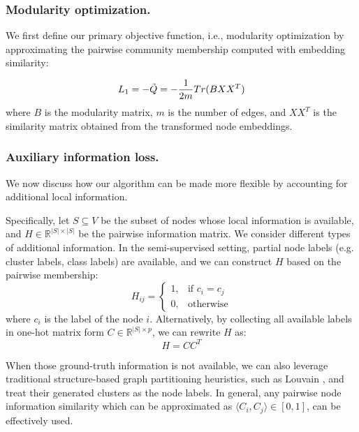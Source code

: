 \subsubsection{Modularity optimization.}
We first define our primary objective function, i.e., modularity optimization by approximating the pairwise community membership computed with embedding similarity:%

\begin{equation}
    L_1=-\Tilde{Q} = -\frac{1}{2m}Tr(BXX^T) 
\end{equation}
where $B$ is the modularity matrix, $m$ is the number of edges, and $XX^T$ is the similarity matrix obtained from the transformed node embeddings.







\subsubsection{Auxiliary information loss.}
We now discuss how our algorithm can be made more flexible by accounting for additional local information. %






Specifically, let $S \subseteq V$ be the subset of nodes whose local information is available, and $H \in \mathbb{R}^{|S| \times |S|}$ be the pairwise information matrix. We consider different types of additional information. In the semi-supervised setting, partial node labels (e.g. cluster labels, class labels) are available, and we can construct $H$ based on the pairwise membership: 
\begin{equation}
    H_{ij}=
    \begin{cases}
        1,& \text{if } c_i=c_j\\
        0,& \text{otherwise}
    \end{cases}
\end{equation}
where $c_i$ is the label of the node $i$. Alternatively, by collecting all available labels in one-hot matrix form $C \in \mathbb{R}^{|S| \times p}$, we can rewrite $H$ as: 
\begin{equation}
    H = CC^T
\end{equation}

When those ground-truth information is not available, we can also leverage traditional structure-based graph partitioning heuristics, such as Louvain \cite{blondel2008fast}, and treat their generated clusters as the node labels. 
In general, any pairwise node information similarity which can be approximated as $\langle C_i, C_j\rangle \in [0,1]$, can be effectively used.



